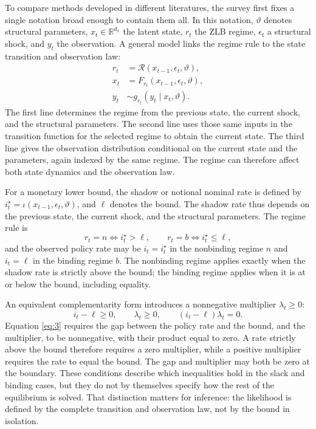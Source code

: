 \documentclass[11pt]{article}
\begin{document}
To compare methods developed in different literatures, the survey first fixes a single notation broad enough to contain them all. In this notation, \(\vartheta\) denotes structural parameters, \(x_t\in\mathbb R^{d_x}\) the latent state, \(r_t\) the ZLB regime, \(\epsilon_t\) a structural shock, and \(y_t\) the observation. A general model links the regime rule to the state transition and observation law:
\begin{equation}\label{eq:1}
\begin{aligned}
 r_t &= \mathcal R(x_{t-1},\epsilon_t,\vartheta),\\
 x_t &= F_{r_t}(x_{t-1},\epsilon_t,\vartheta),\\
 y_t &\sim g_{r_t}(y_t\mid x_t,\vartheta).
\end{aligned}
\end{equation}
The first line determines the regime from the previous state, the current shock, and the structural parameters. The second line uses those same inputs in the transition function for the selected regime to obtain the current state. The third line gives the observation distribution conditional on the current state and the parameters, again indexed by the same regime. The regime can therefore affect both state dynamics and the observation law.

For a monetary lower bound, the shadow or notional nominal rate is defined by \(i_t^\star=\iota(x_{t-1},\epsilon_t,\vartheta)\), and \(\ell\) denotes the bound. The shadow rate thus depends on the previous state, the current shock, and the structural parameters. The regime rule is
\begin{equation}\label{eq:2}
 r_t=n \iff i_t^\star>\ell,\qquad
 r_t=b \iff i_t^\star\leq\ell,
\end{equation}
and the observed policy rate may be \(i_t=i_t^\star\) in the nonbinding regime \(n\) and \(i_t=\ell\) in the binding regime \(b\). The nonbinding regime applies exactly when the shadow rate is strictly above the bound; the binding regime applies when it is at or below the bound, including equality.

An equivalent complementarity form introduces a nonnegative multiplier \(\lambda_t\geq0\):
\begin{equation}\label{eq:3}
 i_t-\ell\geq0,\qquad \lambda_t\geq0,\qquad
 (i_t-\ell)\lambda_t=0.
\end{equation}
Equation \eqref{eq:3} requires the gap between the policy rate and the bound, and the multiplier, to be nonnegative, with their product equal to zero. A rate strictly above the bound therefore requires a zero multiplier, while a positive multiplier requires the rate to equal the bound. The gap and multiplier may both be zero at the boundary. These conditions describe which inequalities hold in the slack and binding cases, but they do not by themselves specify how the rest of the equilibrium is solved. That distinction matters for inference: the likelihood is defined by the complete transition and observation law, not by the bound in isolation.
\end{document}
